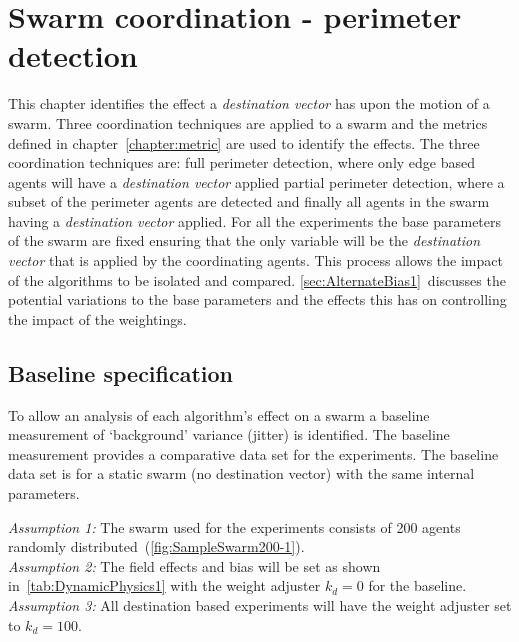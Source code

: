 \chapter{Swarm coordination - perimeter detection}\label{chapter:coordination}
This chapter identifies the effect a \textit{destination vector} has upon the motion of a swarm. Three coordination techniques are applied to a swarm and the metrics defined in chapter~\ref{chapter:metric} are used to identify the effects. The three coordination techniques are: full perimeter detection, where only edge based agents will have a \textit{destination vector} applied partial perimeter detection, where a subset of the perimeter agents are detected and finally all agents in the swarm having a \textit{destination vector} applied. For all the experiments the base parameters of the swarm are fixed ensuring that the only variable will be the \textit{destination vector} that is applied by the coordinating agents. This process allows the impact of the algorithms to be isolated and compared. \autoref{sec:AlternateBias1}~discusses the potential variations to the base parameters and the effects this has on controlling the impact of the weightings.

\section{Baseline specification}
To allow an analysis of each algorithm's effect on a swarm a baseline measurement of `background' variance (jitter) is identified. The baseline measurement provides a comparative data set for the experiments. The baseline data set is for a static swarm (no destination vector) with the same internal parameters.

\textit{Assumption 1:} The swarm used for the experiments consists of 200 agents randomly distributed~(\autoref{fig:SampleSwarm200-1}).\\ 
\textit{Assumption 2:} The field effects and bias will be set as shown in~\autoref{tab:DynamicPhysics1} with the weight adjuster $k_d = 0$ for the baseline.\\
\textit{Assumption 3:} All destination based experiments will have the weight adjuster set to $k_d = 100$.

